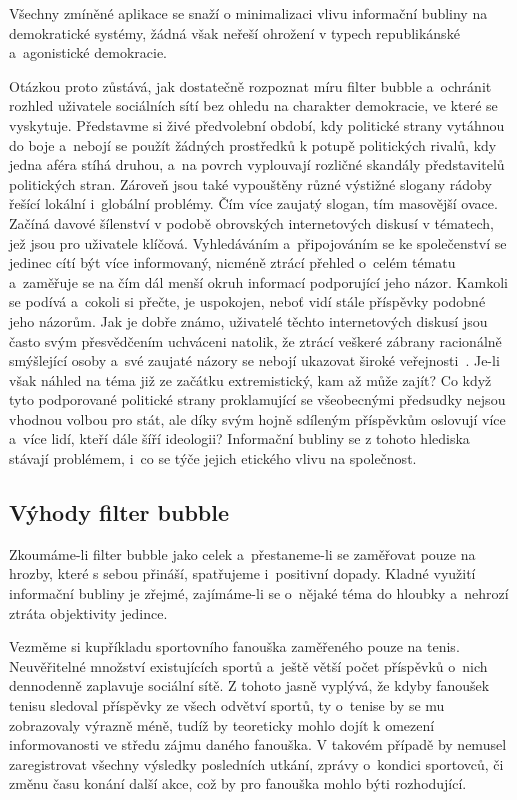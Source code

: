 \documentclass[12pt, a4paper]{article}
\numberwithin{equation}{section} 	%
\begin{document}
Všechny zmíněné aplikace se snaží o minimalizaci vlivu informační bubliny na demokratické systémy, žádná však neřeší ohrožení v typech republikánské a~agonistické demokracie.

Otázkou proto zůstává, jak dostatečně rozpoznat míru filter bubble a~ochránit rozhled uživatele sociálních sítí bez ohledu na charakter demokracie, ve které se vyskytuje. Představme si živé předvolební období, kdy politické strany vytáhnou do boje a~nebojí se použít žádných prostředků k potupě politických rivalů, kdy jedna aféra stíhá druhou, a~na povrch vyplouvají rozličné skandály představitelů politických stran. Zároveň jsou také vypouštěny různé výstižné slogany rádoby řešící lokální i~globální problémy. Čím více zaujatý slogan, tím masovější ovace. Začíná davové šílenství v podobě obrovských internetových diskusí v tématech, jež jsou pro uživatele klíčová. Vyhledáváním a~připojováním se ke společenství se jedinec cítí být více informovaný, nicméně ztrácí přehled o~celém tématu a~zaměřuje se na čím dál menší okruh informací podporující jeho názor. Kamkoli se podívá a~cokoli si přečte, je uspokojen, neboť vidí stále příspěvky podobné jeho názorům. Jak je dobře známo, uživatelé těchto internetových diskusí jsou často svým přesvědčením uchváceni natolik, že ztrácí veškeré zábrany racionálně smýšlející osoby a~své zaujaté názory se nebojí ukazovat široké veřejnosti~\cite{DemocracyOnline}. Je-li však náhled na téma již ze začátku extremistický, kam až může zajít? Co když tyto podporované politické strany proklamující se všeobecnými předsudky nejsou vhodnou volbou pro stát, ale díky svým hojně sdíleným příspěvkům oslovují více a~více lidí, kteří dále šíří ideologii? Informační bubliny se z tohoto hlediska stávají problémem, i~co se týče jejich etického vlivu na společnost.


\subsection{Výhody filter bubble}
\noindent Zkoumáme-li filter bubble jako celek a~přestaneme-li se zaměřovat pouze na hrozby, které s sebou přináší, spatřujeme i~positivní dopady. Kladné využití informační bubliny je zřejmé, zajímáme-li se o~nějaké téma do hloubky a~nehrozí ztráta objektivity jedince.

Vezměme si kupříkladu sportovního fanouška zaměřeného pouze na tenis. Neuvěřitelné množství existujících sportů a~ještě větší počet příspěvků o~nich dennodenně zaplavuje sociální sítě. Z tohoto jasně vyplývá, že kdyby fanoušek tenisu sledoval příspěvky ze všech odvětví sportů, ty o~tenise by se mu zobrazovaly výrazně méně, tudíž by teoreticky mohlo dojít k omezení informovanosti ve středu zájmu daného fanouška. V takovém případě by nemusel zaregistrovat všechny výsledky posledních utkání, zprávy o~kondici sportovců, či změnu času konání další akce, což by pro fanouška mohlo býti rozhodující.
\end{document}
